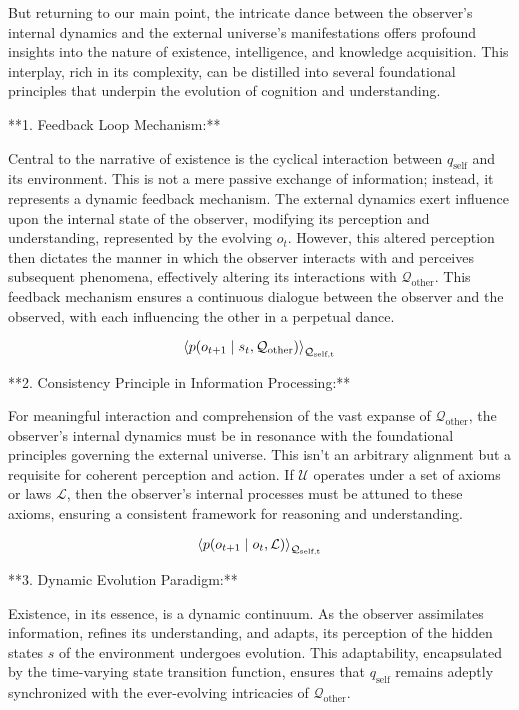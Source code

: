 But returning to our main point, the intricate dance between the observer's internal dynamics and the external universe's manifestations offers profound insights into the nature of existence, intelligence, and knowledge acquisition. This interplay, rich in its complexity, can be distilled into several foundational principles that underpin the evolution of cognition and understanding.

**1. Feedback Loop Mechanism:**

Central to the narrative of existence is the cyclical interaction between \( q_{\text{self}} \) and its environment. This is not a mere passive exchange of information; instead, it represents a dynamic feedback mechanism. The external dynamics exert influence upon the internal state of the observer, modifying its perception and understanding, represented by the evolving \( o_t \). However, this altered perception then dictates the manner in which the observer interacts with and perceives subsequent phenomena, effectively altering its interactions with \( \mathcal{Q}_{\text{other}} \). This feedback mechanism ensures a continuous dialogue between the observer and the observed, with each influencing the other in a perpetual dance.

\[
\left\langle p(o_{t+1} \mid s_t, \mathcal{Q}_{\text{other}}) \right\rangle_{\substack{\mathcal{Q}_{\text{self,t}}}}
\]

**2. Consistency Principle in Information Processing:** 

For meaningful interaction and comprehension of the vast expanse of \( \mathcal{Q}_{\text{other}} \), the observer's internal dynamics must be in resonance with the foundational principles governing the external universe. This isn't an arbitrary alignment but a requisite for coherent perception and action. If \( \mathcal{U} \) operates under a set of axioms or laws \( \mathcal{L} \), then the observer's internal processes must be attuned to these axioms, ensuring a consistent framework for reasoning and understanding.

\[
\left\langle p(o_{t+1} \mid o_t, \mathcal{L}) \right\rangle_{\substack{\mathcal{Q}_{\text{self,t}}}}
\]

**3. Dynamic Evolution Paradigm:** 

Existence, in its essence, is a dynamic continuum. As the observer assimilates information, refines its understanding, and adapts, its perception of the hidden states \( s \) of the environment undergoes evolution. This adaptability, encapsulated by the time-varying state transition function, ensures that \( q_{\text{self}} \) remains adeptly synchronized with the ever-evolving intricacies of \( \mathcal{Q}_{\text{other}} \).

